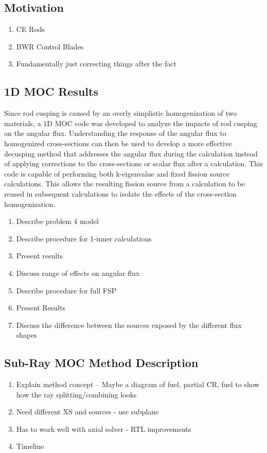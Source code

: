\subsection{Motivation}

\begin{enumerate}[leftmargin=*]
  \item CE Rods
  \item BWR Control Blades
  \item Fundamentally just correcting things after the fact
\end{enumerate}

\subsection{1D MOC Results}

Since rod cusping is caused by an overly simplistic homogenization of two materials, a 1D MOC code was developed to analyze the impacts of rod cusping on the angular flux.  Understanding the response of the angular flux to homogenized cross-sections can then be used to develop a more effective decusping method that addresses the angular flux during the calculation instead of applying corrections to the cross-sections or scalar flux after a calculation.  This code is capable of performing both k-eigenvalue and fixed fission source calculations.  This allows the resulting fission source from a calculation to be reused in subsequent calculations to isolate the effects of the cross-section homogenization.

\begin{enumerate}[leftmargin=*]
  \item Describe problem 4 model
  \item Describe procedure for 1-inner calculations
  \item Present results
  \item Discuss range of effects on angular flux
  \item Describe procedure for full FSP
  \item Present Results
  \item Discuss the difference between the sources exposed by the different flux shapes
\end{enumerate} 

\subsection{Sub-Ray MOC Method Description}

\begin{enumerate}[leftmargin=*]
  \item Explain method concept -- Maybe a diagram of fuel, partial CR, fuel to show how the ray splitting/combining looks
  \item Need different XS and sources - use subplane
  \item Has to work well with axial solver - RTL improvements
  \item Timeline
\end{enumerate}